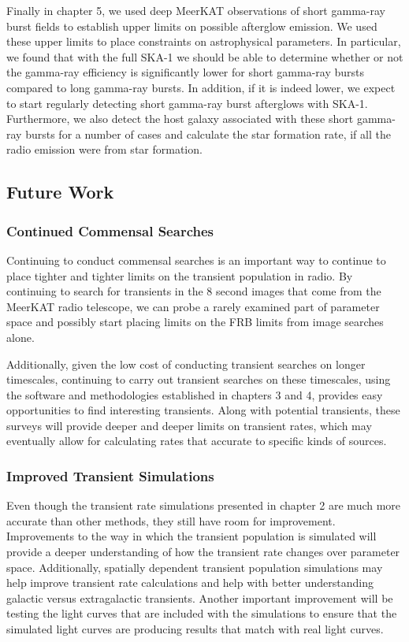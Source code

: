 \documentclass[12pt]{article}
\begin{document}
Finally in chapter 5, we used deep MeerKAT observations of short gamma-ray burst fields to establish upper limits on possible afterglow emission. We used these upper limits to place constraints on astrophysical parameters. In particular, we found that with the full SKA-1 we should be able to determine whether or not the gamma-ray efficiency is significantly lower for short gamma-ray bursts compared to long gamma-ray bursts. In addition, if it is indeed lower, we expect to start regularly detecting short gamma-ray burst afterglows with SKA-1. Furthermore, we also detect the host galaxy associated with these short gamma-ray bursts for a number of cases and calculate the star formation rate, if all the radio emission were from star formation. 
\subsection{Future Work}
\subsubsection{Continued Commensal Searches} 
Continuing to conduct commensal searches is an important way to continue to place tighter and tighter limits on the transient population in radio. By continuing to search for transients in the 8 second images that come from the MeerKAT radio telescope, we can probe a rarely examined part of parameter space and possibly start placing limits on the FRB limits from image searches alone. 

Additionally, given the low cost of conducting transient searches on longer timescales, continuing to carry out transient searches on these timescales, using the software and methodologies established in chapters 3 and 4, provides easy opportunities to find interesting transients. Along with potential transients, these surveys will provide deeper and deeper limits on transient rates, which may eventually allow for calculating rates that accurate to specific kinds of sources.

\subsubsection{Improved Transient Simulations}
Even though the transient rate simulations presented in chapter 2 are much more accurate than other methods, they still have room for improvement. Improvements to the way in which the transient population is simulated will provide a deeper understanding of how the transient rate changes over parameter space. Additionally, spatially dependent transient population simulations may help improve transient rate calculations and help with better understanding galactic versus extragalactic transients. Another important improvement will be testing the light curves that are included with the simulations to ensure that the simulated light curves are producing results that match with real light curves. 
\newpage
\end{document}
